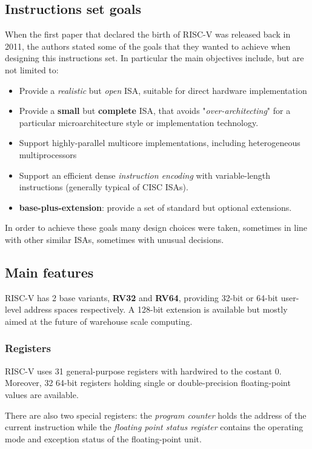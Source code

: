 \documentclass[12pt,oneside,a4paper]{article}
\begin{document}
\subsection{Instructions set goals}
When the first paper that declared the birth of RISC-V \cite{risc-v_original} was released back in 2011, the authors stated some of the goals that they wanted to achieve when designing this instructions set. In particular the main objectives include, but are not limited to:
\begin{itemize}
	\item Provide a \textit{realistic} but \textit{open} ISA, suitable for direct hardware implementation
	\item Provide a \textbf{small} but \textbf{complete} ISA, that avoids "\textit{over-architecting}" for a particular microarchitecture style or implementation technology.
	\item Support highly-parallel multicore implementations, including heterogeneous multiprocessors
	\item Support an efficient dense \textit{instruction encoding} with variable-length instructions (generally typical of CISC ISAs).
	\item \textbf{base-plus-extension}: provide a set of standard but optional extensions.
\end{itemize}
In order to achieve these goals many design choices were taken, sometimes in line with other similar ISAs, sometimes with unusual decisions.

\subsection{Main features}
RISC-V has 2 base variants, \textbf{RV32} and \textbf{RV64}, providing 32-bit or 64-bit user-level address spaces respectively. A 128-bit extension is available but mostly aimed at the future of warehouse scale computing.
\subsubsection{Registers}
RISC-V uses 31 general-purpose registers  {\selectfont{x1-x31}} with  {\selectfont{x0}} hardwired to the costant 0. Moreover, 32 64-bit registers {\selectfont{f0-f31}} holding single or double-precision floating-point values are available.

There are also two special registers: the \textit{program counter} {\selectfont{pc}} holds the address of the current instruction while the \textit{floating point status register} {\selectfont{fsr}} contains the operating mode and exception status of the floating-point unit.
\end{document}
